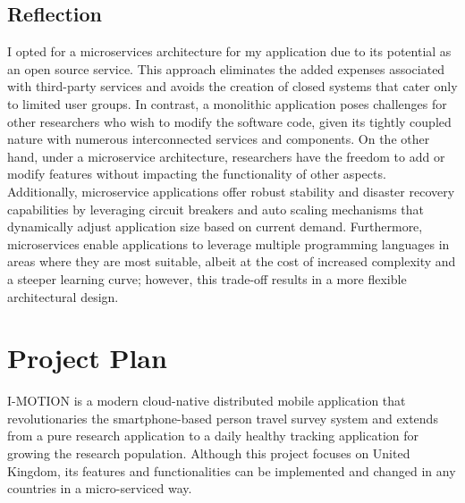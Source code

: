 \documentclass[12pt,two side]{report}
\begin{document}
\section{Reflection}
I opted for a microservices architecture for my application due to its potential as an open source service. This approach eliminates the added expenses associated with third-party services and avoids the creation of closed systems that cater only to limited user groups. In contrast, a monolithic application poses challenges for other researchers who wish to modify the software code, given its tightly coupled nature with numerous interconnected services and components. On the other hand, under a microservice architecture, researchers have the freedom to add or modify features without impacting the functionality of other aspects. Additionally, microservice applications offer robust stability and disaster recovery capabilities by leveraging circuit breakers and auto scaling mechanisms that dynamically adjust application size based on current demand. Furthermore, microservices enable applications to leverage multiple programming languages in areas where they are most suitable, albeit at the cost of increased complexity and a steeper learning curve; however, this trade-off results in a more flexible architectural design.

\chapter{Project Plan}
I-MOTION is a modern cloud-native distributed mobile application that revolutionaries the smartphone-based person travel survey system and extends from a pure research application to a daily healthy tracking application for growing the research population. Although this project focuses on United Kingdom, its features and functionalities can be implemented and changed in any countries in a micro-serviced way.\newline
\end{document}
